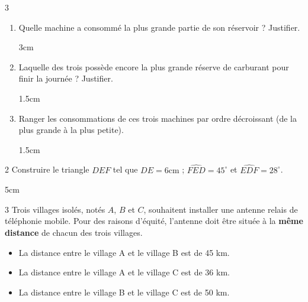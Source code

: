 \documentclass[a4paper]{book}
\begin{document}
{\begin{exerciceNote}{3}
        \begin{enumerate}[leftmargin=*]
            \item Quelle machine a consommé la plus grande partie de son réservoir ? Justifier.

            \begin{ZoneReponse}{3cm}
            \end{ZoneReponse}
            
            \item Laquelle des trois possède encore la plus grande réserve de carburant pour finir la journée ? Justifier.

            \begin{ZoneReponse}{1.5cm}
            \end{ZoneReponse}

            \item Ranger les consommations de ces trois machines par ordre décroissant (de la plus grande à la plus petite).
            
            \begin{ZoneReponse}{1.5cm}
            \end{ZoneReponse}
        \end{enumerate}
    \end{exerciceNote}


\newpage  


    \begin{exerciceNote}{2}
        Construire le triangle $DEF$ tel que $DE=6\text{cm}$ ; $\widehat{FED}=45^{\circ}$ et $\widehat{EDF}=28^{\circ}$.

        \begin{ZoneReponse}{5cm}
        \end{ZoneReponse}
        
    \end{exerciceNote}


    \begin{exerciceNote}{3}
        Trois villages isolés, notés $A$, $B$ et $C$, souhaitent installer une antenne relais de téléphonie mobile. Pour des raisons d'équité, l'antenne doit être située à la \textbf{même distance} de chacun des trois villages.

        \begin{itemize}
            \item La distance entre le village A et le village B est de 45 km.
            \item La distance entre le village A et le village C est de 36 km.
            \item La distance entre le village B et le village C est de 50 km.
        \end{itemize}


\end{exerciceNote}}
\end{document}
